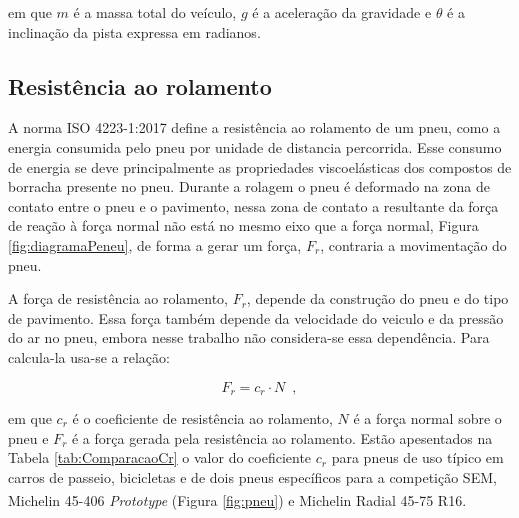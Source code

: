 em que $m$ é a massa total do veículo, $g$ é a aceleração da gravidade e $\theta$ é a inclinação da pista expressa em
radianos\cite{book:guzzella2012vehicle}.

\subsection{Resistência ao rolamento}
\label{subsec:resistencia_rolamento}

A norma ISO 4223-1:2017 define a resistência ao rolamento de um pneu, como a energia consumida pelo pneu por unidade de distancia
percorrida. Esse consumo de energia se deve principalmente as propriedades viscoelásticas dos compostos de borracha presente no pneu.
Durante a rolagem o pneu é deformado na zona de contato entre o pneu e o pavimento, nessa zona de contato a resultante da força de reação à força
normal não
está no mesmo eixo que a força normal, Figura \ref{fig:diagramaPeneu}, de forma a gerar um força, $F_{r}$, contraria a movimentação do pneu.



A força de resistência ao rolamento, $F_{r}$, depende da construção do pneu e do tipo de pavimento. Essa força também depende da velocidade do
veiculo e da pressão do ar no pneu,
embora nesse trabalho não considera-se essa dependência. Para calcula-la usa-se a relação:

\begin{equation}
	\label{eq:Fr}
	F_{r}  = c_{r} \cdot N
	\enspace,
\end{equation}

em que $c_{r}$ é o coeficiente de resistência ao rolamento, $N$ é a força normal sobre o pneu e $F_{r}$ é a força
gerada pela resistência ao rolamento.
Estão apesentados na Tabela \ref{tab:ComparacaoCr}
o valor do coeficiente $c_{r}$ para pneus de uso típico em carros de passeio, bicicletas e de dois pneus específicos para a competição SEM,
Michelin\textsuperscript{\textregistered}
45-406 \textit{Prototype} (Figura \ref{fig:pneu}) e Michelin\textsuperscript{\textregistered} Radial 45-75 R16.


